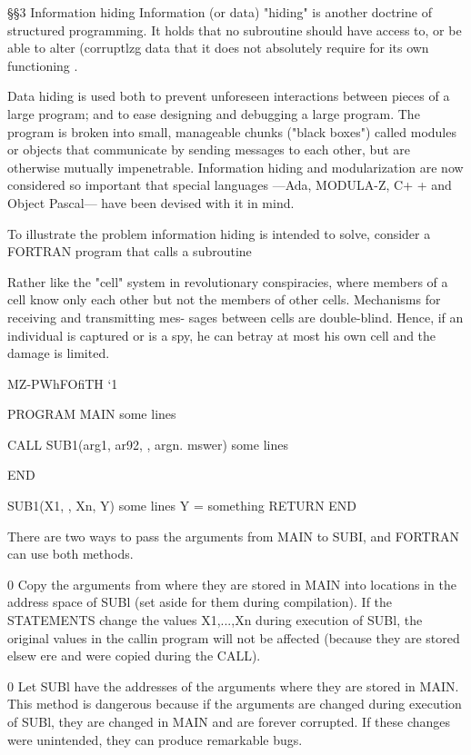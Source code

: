 §§3 Information hiding
Information (or data) "hiding" is another doctrine of structured
programming. It holds that no subroutine should have access
to, or be able to alter (corruptlzg data that it does not absolutely
require for its own functioning .

Data hiding is used both to prevent unforeseen interactions
between pieces of a large program; and to ease designing and
debugging a large program. The program is broken into small,
manageable chunks ("black boxes") called modules or objects
that communicate by sending messages to each other, but are
otherwise mutually impenetrable. Information hiding and
modularization are now considered so important that special
languages —Ada, MODULA-Z, C+ + and Object Pascal— have
been devised with it in mind.

To illustrate the problem information hiding is intended to solve,
consider a FORTRAN program that calls a subroutine

 

Rather like the "cell" system in revolutionary conspiracies, where members of a cell know only
each other but not the members of other cells. Mechanisms for receiving and transmitting mes-
sages between cells are double-blind. Hence, if an individual is captured or is a spy, he can
betray at most his own cell and the damage is limited.

MZ-PWhFOfiTH ‘1

PROGRAM MAIN
some lines

CALL SUB1(arg1, ar92, , argn. mswer)
some lines

END

SUB1(X1, , Xn, Y)
some lines
Y = something
RETURN
END

There are two ways to pass the arguments from MAIN to SUBI,
and FORTRAN can use both methods.

0 Copy the arguments from where they are stored in MAIN into
locations in the address space of SUBl (set aside for them
during compilation). If the STATEMENTS change the values
X1,...,Xn during execution of SUBl, the original values in the
callin program will not be affected (because they are stored
elsew ere and were copied during the CALL).

0 Let SUBl have the addresses of the arguments where they are
stored in MAIN. This method is dangerous because if the
arguments are changed during execution of SUBl, they are
changed in MAIN and are forever corrupted. If these changes
were unintended, they can produce remarkable bugs.

